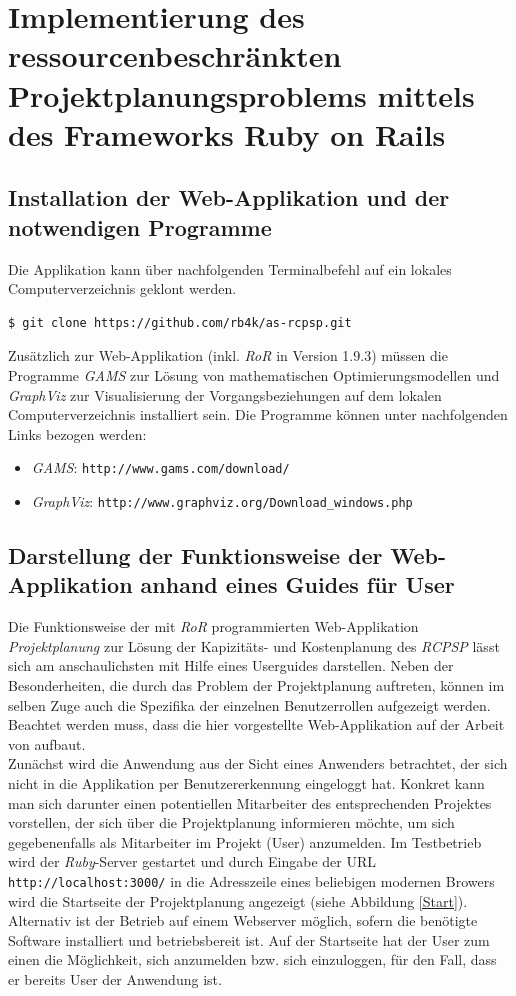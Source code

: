 \documentclass[a4paper,12pt,parskip,bibtotoc,liststotoc]{article}
\begin{document}
\section{Implementierung des ressourcenbeschränkten Projektplanungsproblems mittels des Frameworks Ruby on Rails} \label{Haupt}
\subsection{Installation der Web-Applikation und der notwendigen Programme}
Die Applikation kann über nachfolgenden Terminalbefehl auf ein lokales Computerverzeichnis geklont werden.
\begin{lstlisting}[style=Befehl]
$ git clone https://github.com/rb4k/as-rcpsp.git
\end{lstlisting}
Zusätzlich zur Web-Applikation (inkl. \textit{RoR} in Version 1.9.3) müssen die Programme \textit{GAMS} zur Lösung von mathematischen Optimierungsmodellen und \textit{GraphViz} zur Visualisierung der Vorgangsbeziehungen auf dem lokalen Computerverzeichnis installiert sein. Die Programme können unter nachfolgenden Links bezogen werden:
\begin{itemize}
\item \textit{GAMS}: \texttt{http://www.gams.com/download/}
\item \textit{GraphViz}: \texttt{http://www.graphviz.org/Download\_windows.php}
\end{itemize}

\subsection{Darstellung der Funktionsweise der Web-Applikation anhand eines Guides für User}\label{User}
Die Funktionsweise der mit \textit{RoR} programmierten Web-Applikation \textit {\glqq Projektplanung\grqq} zur Lösung der Kapizitäts- und Kostenplanung des \textit{RCPSP} lässt sich am anschaulichsten mit Hilfe eines Userguides darstellen. 
Neben der Besonderheiten, die durch das Problem der Projektplanung auftreten, können im selben Zuge auch die Spezifika der einzelnen Benutzerrollen aufgezeigt werden. Beachtet werden muss, dass die hier vorgestellte Web-Applikation auf der Arbeit von \cite{hartl2012ruby} aufbaut.\\

Zunächst wird die Anwendung aus der Sicht eines Anwenders betrachtet, der sich nicht in die Applikation per Benutzererkennung eingeloggt hat. Konkret kann man sich darunter einen potentiellen Mitarbeiter des entsprechenden Projektes vorstellen, der sich über die Projektplanung informieren möchte, um sich gegebenenfalls als Mitarbeiter im Projekt (User) anzumelden. Im Testbetrieb wird der \textit{Ruby}-Server gestartet und durch Eingabe der URL \texttt{http://localhost:3000/} in die Adresszeile eines beliebigen modernen Browers wird die Startseite der Projektplanung angezeigt (siehe Abbildung \ref{Start}). Alternativ ist der Betrieb auf einem Webserver möglich, sofern die benötigte Software installiert und betriebsbereit ist. Auf der Startseite hat der User zum einen die Möglichkeit, sich anzumelden bzw. sich einzuloggen, für den Fall, dass er bereits User der Anwendung ist. \\
\end{document}
